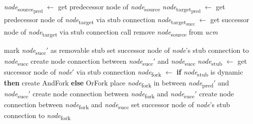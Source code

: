 \begin{algorithm}                     
	\begin{algorithmic}[1]
		
		 \label{alg:2.15}
			\State \emph{node}\textsubscript{source\textsubscript{pred}} $\gets$ get predecessor node of \emph{node}\textsubscript{source}
			\State \emph{node}\textsubscript{target\textsubscript{pred}} $\gets$ get predecessor node of \emph{node}\textsubscript{target} via stub connection
			\State \emph{node}\textsubscript{target\textsubscript{succ}} $\gets$ get successor node of \emph{node}\textsubscript{target} via stub connection
			\State call 
			\State remove \emph{node}\textsubscript{source} from \emph{ucm}
		\EndFunction \label{alg:2.16}
		
			 \label{alg:2.17}
				\State mark \emph{node}\textsubscript{succ}$'$ as removable stub
				\State set successor node of \emph{node}'s stub connection to \emph{node}\textsubscript{succ} \label{alg:2.18}
			 \label{alg:2.19}
				\State create node connection between \emph{node}\textsubscript{succ}$'$ and \emph{node}\textsubscript{succ} \label{alg:2.20}
			\Else \label{alg:2.21}
				\State \emph{node}\textsubscript{stub} $\gets$ get successor node of \emph{node}$'$ via stub connection
				\State \emph{node}\textsubscript{fork} $\gets$ \textbf{if} \emph{node}\textsubscript{stub} is dynamic \textbf{then} create {\cls AndFork} \textbf{else} {\cls OrFork}
				\State place \emph{node}\textsubscript{fork} in between \emph{node}\textsubscript{pred}$'$ and \emph{node}\textsubscript{succ}$'$
				\State create node connection between \emph{node}\textsubscript{fork} and \emph{node}\textsubscript{succ}$'$
				\State create node connection between \emph{node}\textsubscript{fork} and \emph{node}\textsubscript{succ}
				\State set successor node of \emph{node}'s stub connection to \emph{node}\textsubscript{fork}
			\EndIf \label{alg:2.22}
		\EndFunction
		

\end{algorithmic}
\end{algorithm}
